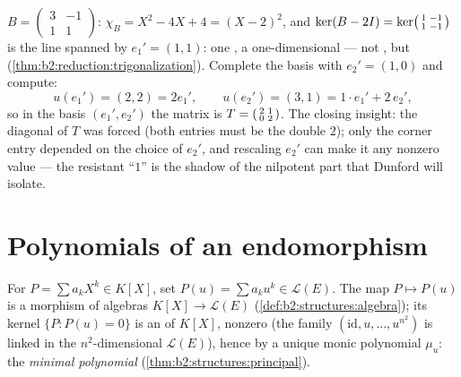 \begin{example}\label{ex:b2:reduction:trigwork}
$B = \begin{pmatrix}3 & -1\\ 1 & 1\end{pmatrix}$: $\chi_B = X^2 -
4X + 4 = (X - 2)^2$, and $\ker(B - 2I) =
\ker\begin{psmallmatrix}1 & -1\\ 1 & -1\end{psmallmatrix}$ is
the line spanned by $e_1' = (1, 1)$: one , a
one-dimensional  --- not , but
 (\cref{thm:b2:reduction:trigonalization}).
Complete the basis with $e_2' = (1, 0)$ and compute:
\[
u(e_1') = (2, 2) = 2e_1',
\qquad
u(e_2') = (3, 1) = 1\cdot e_1' + 2\, e_2' ,
\]
so in the basis $(e_1', e_2')$ the matrix is $T =
\begin{psmallmatrix}2 & 1\\ 0 & 2\end{psmallmatrix}$. The
closing insight: the diagonal of $T$ was forced (both entries
must be the double  $2$); only the corner entry
depended on the choice of $e_2'$, and rescaling $e_2'$ can make
it any nonzero value --- the resistant ``$1$'' is the shadow of
the nilpotent part that Dunford will isolate.
\end{example}

\section{Polynomials of an endomorphism}

\begin{definition}\label{def:b2:reduction:polyu}
For $P = \sum a_k X^k \in K[X]$, set $P(u) = \sum a_k u^k \in
\mathcal{L}(E)$. The map $P \mapsto P(u)$ is a morphism of algebras
$K[X] \to \mathcal{L}(E)$ (\cref{def:b2:structures:algebra});
its kernel $\{P : P(u) = 0\}$ is an  of $K[X]$, nonzero (the
family $(\mathrm{id}, u, \dots, u^{n^2})$ is linked in the
$n^2$-dimensional $\mathcal{L}(E)$), hence  by a unique
monic polynomial $\mu_u$: the \emph{minimal
polynomial}
(\cref{thm:b2:structures:principal}).
\end{definition}

